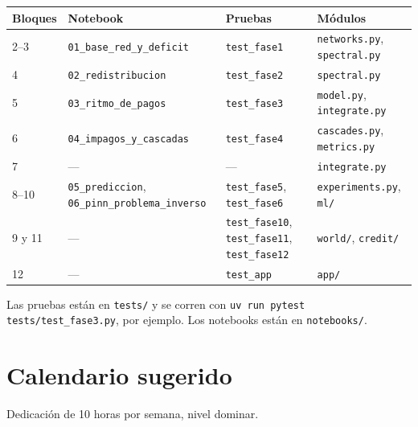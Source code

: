 \documentclass[11pt,a4paper,oneside]{article}
\begin{document}
\begin{center}
\small
\begin{tabular}{p{}p{}p{}p{}}
\toprule
\textbf{Bloques} & \textbf{Notebook} & \textbf{Pruebas} & \textbf{Módulos} \\
\midrule
2–3 & \texttt{01\_base\_red\_y\_deficit} & \texttt{test\_fase1} &
\texttt{networks.py}, \texttt{spectral.py} \\
4 & \texttt{02\_redistribucion} & \texttt{test\_fase2} & \texttt{spectral.py} \\
5 & \texttt{03\_ritmo\_de\_pagos} & \texttt{test\_fase3} & \texttt{model.py},
\texttt{integrate.py} \\
6 & \texttt{04\_impagos\_y\_cascadas} & \texttt{test\_fase4} & \texttt{cascades.py},
\texttt{metrics.py} \\
7 & — & — & \texttt{integrate.py} \\
8–10 & \texttt{05\_prediccion}, \texttt{06\_pinn\_problema\_inverso} &
\texttt{test\_fase5}, \texttt{test\_fase6} & \texttt{experiments.py}, \texttt{ml/} \\
9 y 11 & — & \texttt{test\_fase10}, \texttt{test\_fase11}, \texttt{test\_fase12} &
\texttt{world/}, \texttt{credit/} \\
12 & — & \texttt{test\_app} & \texttt{app/} \\
\bottomrule
\end{tabular}
\end{center}

Las pruebas están en \texttt{tests/} y se corren con \texttt{uv run pytest
tests/test\_fase3.py}, por ejemplo. Los notebooks están en \texttt{notebooks/}.

\section{Calendario sugerido}

Dedicación de 10 horas por semana, nivel dominar.
\end{document}
